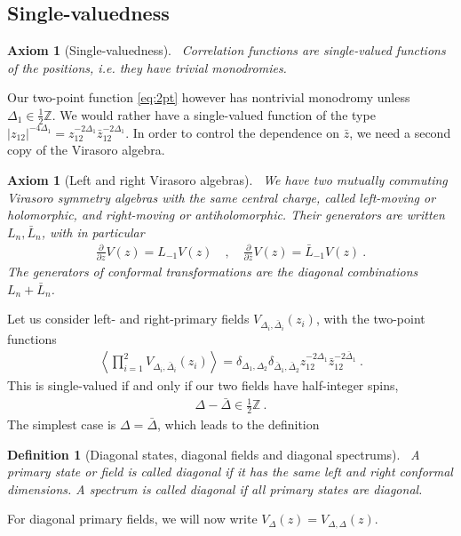 \documentclass[12pt, a4paper]{article}
\theoremstyle{break}
\newtheorem{hyp}[exo]{Axiom}
\newtheorem{defn}[exo]{Definition}
\begin{document}
\subsection{Single-valuedness}\label{sec:sv}

\begin{hyp}[Single-valuedness]
 ~\label{hyp:sv}
 Correlation functions are single-valued functions of the positions, i.e. they have trivial monodromies.
\end{hyp}
Our two-point function \eqref{eq:2pt} however has nontrivial monodromy unless $\Delta_1\in \frac12\mathbb{Z}$. 
We would rather have a single-valued function of the type $|z_{12}|^{-4\Delta_1} = z_{12}^{-2\Delta_1} \bar z_{12}^{-2\Delta_1}$.
In order to control the dependence on $\bar z$, we need  a second copy of the Virasoro algebra.

\begin{hyp}[Left and right Virasoro algebras]
 ~\label{hyp:lr}
 We have two mutually commuting Virasoro symmetry algebras with the same central charge, called left-moving or holomorphic, and right-moving or antiholomorphic. Their generators are written $L_n,\bar L_n$, with in particular
 \begin{align}
  \frac{\partial}{\partial z} V(z) = L_{-1}V(z)   \quad , \quad \frac{\partial}{\partial \bar z} V(z)= \bar L_{-1} V(z)   \ .
 \end{align}
 The generators of conformal transformations are the diagonal combinations $L_n+\bar L_n$.
\end{hyp}
Let us consider left- and right-primary fields $V_{\Delta_i,\bar\Delta_i}(z_i)$, with the 
two-point functions
\begin{align}
 \left<\prod_{i=1}^2 V_{\Delta_i,\bar\Delta_i}(z_i) \right> = \delta_{\Delta_1,\Delta_2}\delta_{\bar\Delta_1,\bar\Delta_2} z_{12}^{-2\Delta_1} \bar z_{12}^{-2\bar\Delta_1}\ .
\end{align}
This is single-valued if and only if our two fields have half-integer spins,
\begin{align}
 \Delta -\bar \Delta \in \frac12\mathbb{Z}\ .
\end{align} 
The simplest case is $\Delta=\bar\Delta$, which leads to the definition

\begin{defn}[Diagonal states, diagonal fields and diagonal spectrums]
 ~\label{def:diag}
 A primary state or field is called diagonal if it has the same left and right conformal dimensions. A spectrum is called diagonal if all primary states are diagonal.
\end{defn}
For diagonal primary fields, we will now write  $V_\Delta(z) = V_{\Delta,\Delta}(z)$.
\end{document}
